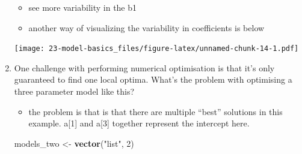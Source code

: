 \documentclass[]{book}
\newenvironment{Shaded}{\begin{snugshade}}{\end{snugshade}}
\newcommand{\ControlFlowTok}[1]{\textcolor[rgb]{0.13,0.29,0.53}{\textbf{#1}}}
\newcommand{\DataTypeTok}[1]{\textcolor[rgb]{0.13,0.29,0.53}{#1}}
\newcommand{\DecValTok}[1]{\textcolor[rgb]{0.00,0.00,0.81}{#1}}
\newcommand{\KeywordTok}[1]{\textcolor[rgb]{0.13,0.29,0.53}{\textbf{#1}}}
\newcommand{\NormalTok}[1]{#1}
\newcommand{\OperatorTok}[1]{\textcolor[rgb]{0.81,0.36,0.00}{\textbf{#1}}}
\newcommand{\StringTok}[1]{\textcolor[rgb]{0.31,0.60,0.02}{#1}}
\providecommand{\tightlist}{%
  \setlength{\itemsep}{0pt}\setlength{\parskip}{0pt}}
\theoremstyle{definition}
\theoremstyle{definition}
\theoremstyle{definition}
\theoremstyle{remark}
\begin{document}
\begin{enumerate}
  \begin{itemize}
  \tightlist
  \item
    see more variability in the b1
  \item
    another way of visualizing the variability in coefficients is below
  \end{itemize}

\begin{Shaded}
\end{Shaded}

  \texttt{[image: 23-model-basics\_files/figure-latex/unnamed-chunk-14-1.pdf]}
\item
  One challenge with performing numerical optimisation is that it's only
  guaranteed to find one local optima. What's the problem with
  optimising a three parameter model like this?

\begin{Shaded}
\end{Shaded}

  \begin{itemize}
  \tightlist
  \item
    the problem is that is that there are multiple ``best'' solutions in
    this example. a{[}1{]} and a{[}3{]} together represent the intercept
    here.
  \end{itemize}

\begin{Shaded}
\begin{Highlighting}[]
\NormalTok{models_two <-}\StringTok{ }\KeywordTok{vector}\NormalTok{(}\StringTok{"list"}\NormalTok{, }\DecValTok{2}\NormalTok{)}


\end{Highlighting}
\end{Shaded}
\end{enumerate}
\end{document}
